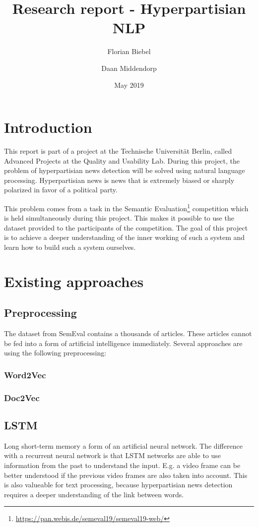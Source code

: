 \documentclass{article}
\title{Research report - Hyperpartisian NLP}
\author{Florian Biebel \and Daan Middendorp}
\date{May 2019}
\begin{document}
\maketitle

\section{Introduction}
This report is part of a project at the Technische Universität Berlin, called Advanced Projects at the Quality and Usability Lab. During this project, the problem of hyperpartisian news detection will be solved using natural language processing. Hyperpartisian news is news that is extremely biased or sharply polarized in favor of a political party.

This problem comes from a task in the Semantic Evaluation\footnote{\url{https://pan.webis.de/semeval19/semeval19-web/}} competition which is held simultaneously during this project. This makes it possible to use the dataset provided to the participants of the competition. The goal of this project is to achieve a deeper understanding of the inner working of such a system and learn how to build such a system ourselves.

\section{Existing approaches}
\subsection{Preprocessing}
The dataset from SemEval contains a thousands of articles. These articles cannot be fed into a form of artificial intelligence immediately. Several approaches are using the following preprocessing:

\subsubsection{Word2Vec}
\subsubsection{Doc2Vec}


\subsection{LSTM}
Long short-term memory a form of an artificial neural network. The difference with a recurrent neural network is that LSTM networks are able to use information from the past to understand the input. E.g. a video frame can be better understood if the previous video frames are also taken into account. This is also valueable for text processing, because hyperpartisian news detection requires a deeper understanding of the link between words.
\end{document}
